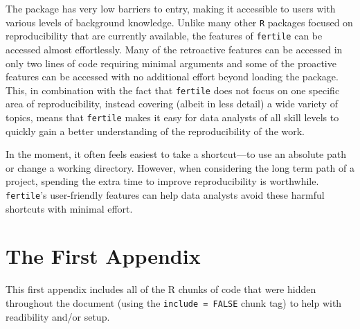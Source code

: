 \documentclass[12pt,twoside]{reedthesis}
\begin{document}
The package has very low barriers to entry, making it accessible to
users with various levels of background knowledge. Unlike many other
\texttt{R} packages focused on reproducibility that are currently
available, the features of \texttt{fertile} can be accessed almost
effortlessly. Many of the retroactive features can be accessed in only
two lines of code requiring minimal arguments and some of the proactive
features can be accessed with no additional effort beyond loading the
package. This, in combination with the fact that \texttt{fertile} does
not focus on one specific area of reproducibility, instead covering
(albeit in less detail) a wide variety of topics, means that
\texttt{fertile} makes it easy for data analysts of all skill levels to
quickly gain a better understanding of the reproducibility of the work.

In the moment, it often feels easiest to take a shortcut---to use an
absolute path or change a working directory. However, when considering
the long term path of a project, spending the extra time to improve
reproducibility is worthwhile. \texttt{fertile}'s user-friendly features
can help data analysts avoid these harmful shortcuts with minimal
effort.

\appendix

\chapter{The First Appendix}\label{the-first-appendix}

This first appendix includes all of the R chunks of code that were
hidden throughout the document (using the \texttt{include\ =\ FALSE}
chunk tag) to help with readibility and/or setup.
\end{document}

